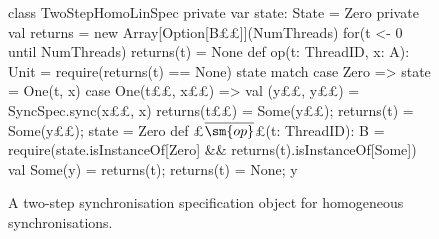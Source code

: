 



\begin{figure}
\begin{scala}
class TwoStepHomoLinSpec{
  private var state: State = Zero
  private val returns = new Array[Option[B££]](NumThreads)
  for(t <- 0 until NumThreads) returns(t) = None
  def op(t: ThreadID, x: A): Unit = {
    require(returns(t) == None)
    state match{
      case Zero => state = One(t, x)
      case One(t££, x££) => 
        val (y££, y££) = SyncSpec.sync(x££, x) 
        returns(t££) = Some(y££); returns(t) = Some(y££); state = Zero
    }
  }
  def £$\overline{\sm{op}}$£(t: ThreadID): B = {
    require(state.isInstanceOf[Zero] && returns(t).isInstanceOf[Some])
    val Some(y) = returns(t); returns(t) = None; y
  }
}
\end{scala}
\caption{A two-step synchronisation specification object for homogeneous
  synchronisations.}
\label{fig:TwoStepHomoLinSpec}
\end{figure}


